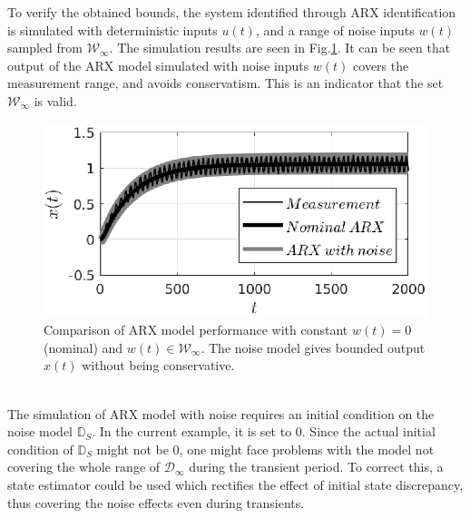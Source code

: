 \documentclass[letterpaper, 10 pt, conference]{ieeeconf}  %
\begin{document}
\begin{enumerate}
	To verify the obtained bounds, the system identified through ARX identification is simulated with deterministic inputs $u(t)$, and a range of noise inputs $w(t)$ sampled from $\mathcal{W}_{\infty}$. The simulation results are seen in Fig.\ref{simulation}. It can be seen that output of the ARX model simulated with noise inputs $w(t)$ covers the measurement range, and avoids conservatism. This is an indicator that the set $\mathcal{W}_{\infty}$ is valid.
	\begin{figure}[h]
		\hspace{22pt}
		\includegraphics[scale = 0.70]{simulation.eps}
		\caption{Comparison of ARX model performance with constant $w(t)=0$(nominal) and $w(t)\in \mathcal{W}_{\infty}$. The noise model gives bounded output $x(t)$ without being conservative.}
		\label{simulation}
	\end{figure} \\
	The simulation of ARX model with noise requires an initial condition on the noise model $\mathbb{D}_S$. In the current example, it is set to $0$. Since the actual initial condition of $\mathbb{D}_S$ might not be $0$, one might face problems with the model not covering the whole range of $\mathcal{D}_{\infty}$ during the transient period. To correct this, a state estimator could be used which rectifies the effect of initial state discrepancy, thus covering the noise effects even during transients.

\end{enumerate}
\end{document}
